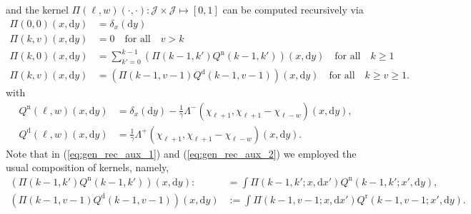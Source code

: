 \documentclass[11pt,leqno]{amsart}
\numberwithin{table}{section}
\numberwithin{figure}{section}
\numberwithin{equation}{section}
\newcommand{\dd}{\mathrm{d}}
\newcommand{\1}{{\mathds{1}}}
\newcommand{\0}{\mat{0}}
\begin{document}
{{and the kernel ${\Pi}(\ell, w)(\cdot,\cdot):\mathcal{J}\times\mathscr{J}\mapsto[0,1]$ can be computed recursively via
\begin{align}
{{\Pi}}(0,0)(x,\dd y)&=\delta_x(\dd y)\nonumber\\
{{\Pi}}(k,v)(x,\dd y)&={0}\quad\mbox{for all}\quad v>k\nonumber\\
{\Pi}(k,0)(x,\dd y)& = \sum_{k'=0}^{k-1}  \left({\Pi}(k-1,k'){Q}^{\mathrm{n}}(k-1,k')\right)(x,\dd y)\quad\mbox{for all}\quad k\ge 1\label{eq:gen_rec_aux_1}\\
{\Pi}(k,v)(x,\dd y)& = \left({\Pi}(k-1,v-1){Q}^{\mathrm{d}}(k-1,v-1)\right)(x,\dd y)\quad\mbox{for all}\quad k\ge v\ge 1.\label{eq:gen_rec_aux_2}
\end{align}
with
\begin{align*}
{Q}^{\mathrm{n}}(\ell,w)(x,\dd y) &= \delta_x(\dd y)-\frac{1}{\gamma}\Lambda^-(\chi_{\ell+1}, \chi_{\ell+1}-\chi_{\ell-w})(x,\dd y),\\
{Q}^{\mathrm{d}}(\ell,w)(x,\dd y) &=\frac{1}{\gamma}\Lambda^+(\chi_{\ell+1}, \chi_{\ell+1}-\chi_{\ell-w})(x,\dd y).
\end{align*}
Note that in (\ref{eq:gen_rec_aux_1}) and (\ref{eq:gen_rec_aux_2}) we employed the usual composition of kernels, namely, 
\begin{align*}
\left({\Pi}(k-1,k'){Q}^{\mathrm{n}}(k-1,k')\right)(x,\dd y):& =\int {\Pi}(k-1,k';x,\dd x'){Q}^{\mathrm{n}}(k-1,k';x',\dd y),\\
\left({\Pi}(k-1,v-1){Q}^{\mathrm{d}}(k-1,v-1)\right)(x,\dd y) & := \int {\Pi}(k-1,v-1;x,\dd x'){Q}^{\mathrm{r}}(k-1,v-1;x',\dd y).
\end{align*}

}}
\end{document}
